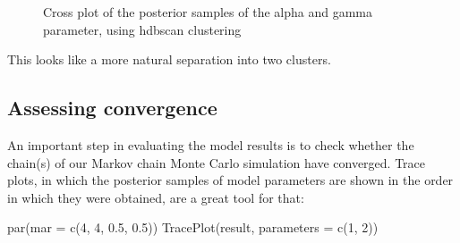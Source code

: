 \documentclass[
  letterpaper,
  DIV=11,
  numbers=noendperiod]{scrartcl}
\newenvironment{Shaded}{\begin{snugshade}}{\end{snugshade}}
\newcommand{\AttributeTok}[1]{\textcolor[rgb]{0.40,0.45,0.13}{#1}}
\newcommand{\DecValTok}[1]{\textcolor[rgb]{0.68,0.00,0.00}{#1}}
\newcommand{\FloatTok}[1]{\textcolor[rgb]{0.68,0.00,0.00}{#1}}
\newcommand{\FunctionTok}[1]{\textcolor[rgb]{0.28,0.35,0.67}{#1}}
\newcommand{\NormalTok}[1]{\textcolor[rgb]{0.00,0.23,0.31}{#1}}
\begin{document}
\begin{figure}[H]


\caption{\label{fig-9b}Cross plot of the posterior samples of the alpha
and gamma parameter, using hdbscan clustering}

\end{figure}%

This looks like a more natural separation into two clusters.

\subsection{Assessing convergence}\label{assessing-convergence}

An important step in evaluating the model results is to check whether
the chain(s) of our Markov chain Monte Carlo simulation have converged.
Trace plots, in which the posterior samples of model parameters are
shown in the order in which they were obtained, are a great tool for
that:

\begin{Shaded}
\begin{Highlighting}[]
\FunctionTok{par}\NormalTok{(}\AttributeTok{mar =} \FunctionTok{c}\NormalTok{(}\DecValTok{4}\NormalTok{, }\DecValTok{4}\NormalTok{, }\FloatTok{0.5}\NormalTok{, }\FloatTok{0.5}\NormalTok{))}
\FunctionTok{TracePlot}\NormalTok{(result, }\AttributeTok{parameters =} \FunctionTok{c}\NormalTok{(}\DecValTok{1}\NormalTok{, }\DecValTok{2}\NormalTok{))}
\end{Highlighting}
\end{Shaded}
\end{document}
